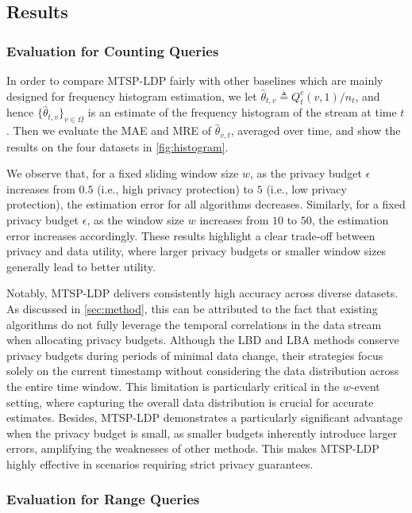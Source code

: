 
\subsection{Results}

\subsubsection{Evaluation for Counting Queries}



In order to compare MTSP-LDP fairly with other baselines which are mainly
designed for frequency histogram estimation, we let $\hat\theta_{t,v}\triangleq
Q_t^c(v,1)/n_t$, and hence $\{\hat\theta_{t,v}\}_{v\in\Omega}$ is an estimate of
the frequency histogram of the stream at time $t$.
Then we evaluate the MAE and MRE of $\hat\theta_{v,t}$, averaged over time, and show
the results on the four datasets in \cref{fig:histogram}.

We observe that, for a fixed sliding window size $w$, as the privacy budget
$\epsilon$ increases from $0.5$ (i.e., high privacy protection) to $5$ (i.e., low
privacy protection), the estimation error for all algorithms decreases.
Similarly, for a fixed privacy budget $\epsilon$, as the window size $w$
increases from $10$ to $50$, the estimation error increases accordingly.
These results highlight a clear trade-off between privacy and data utility,
where larger privacy budgets or smaller window sizes generally lead to better
utility.

Notably, MTSP-LDP delivers consistently high accuracy across diverse datasets.
As discussed in \cref{sec:method}, this can be attributed to the fact that
existing algorithms do not fully leverage the temporal correlations in the data
stream when allocating privacy budgets.
Although the LBD and LBA methods conserve privacy budgets during periods of
minimal data change, their strategies focus solely on the current timestamp
without considering the data distribution across the entire time window.
This limitation is particularly critical in the $w$-event setting, where
capturing the overall data distribution is crucial for accurate estimates.
Besides, MTSP-LDP demonstrates a particularly significant advantage when the
privacy budget is small, as smaller budgets inherently introduce larger errors,
amplifying the weaknesses of other methods.
This makes MTSP-LDP highly effective in scenarios requiring strict privacy
guarantees.


\subsubsection{Evaluation for Range Queries}

